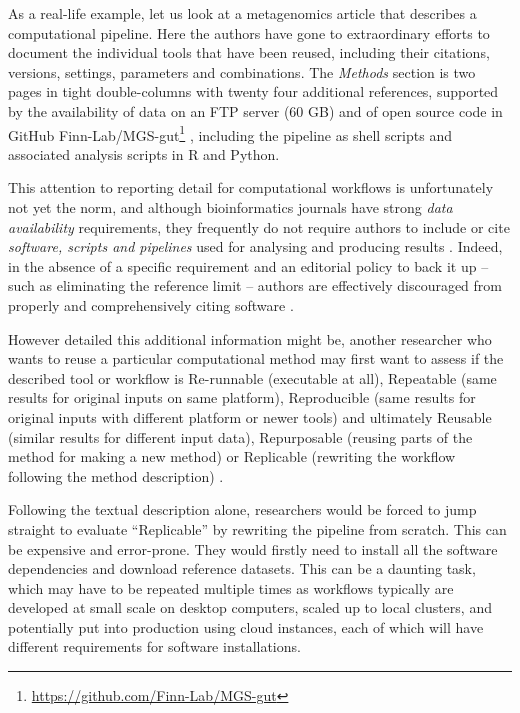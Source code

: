 As a real-life example, let us look at a metagenomics article
\cite{Almeida 2019} that describes
a computational pipeline. Here the authors have gone to extraordinary
efforts to document the individual tools that have been reused,
including their citations, versions, settings, parameters and
combinations. The \emph{Methods} section is two pages in tight
double-columns with twenty four additional references, supported by the
availability of data on an FTP server (60 GB)
\cite{EMBL-EBI 2019}
and of open source code in GitHub
Finn-Lab/MGS-gut\footnote{\url{https://github.com/Finn-Lab/MGS-gut}}
\cite{finn-lab-mgsgut}, including the
pipeline as shell scripts and associated analysis scripts in R and
Python.

This attention to reporting detail for computational workflows is
unfortunately not yet the norm, and although bioinformatics journals
have strong \emph{data availability} requirements, they frequently do
not require authors to include or cite \emph{software, scripts and
pipelines} used for analysing and producing results \cite{ch5-108}.
Indeed, in the absence of a specific requirement and an editorial policy
to back it up -- such as eliminating the reference limit -- authors are
effectively discouraged from properly and comprehensively citing
software \cite{ch5-53}.

However detailed this additional information might be, another
researcher who wants to reuse a particular computational method may
first want to assess if the described tool or workflow is Re-runnable
(executable at all), Repeatable (same results for original inputs on
same platform), Reproducible (same results for original inputs with
different platform or newer tools) and ultimately Reusable (similar
results for different input data), Repurposable (reusing parts of the
method for making a new method) or Replicable (rewriting the workflow
following the method description)
\cite{Benureau 2017,ch5-54}.

Following the textual description alone, researchers would be forced to
jump straight to evaluate ``Replicable'' by rewriting the pipeline from
scratch. This can be expensive and error-prone. They would firstly need
to install all the software dependencies and download reference
datasets. This can be a daunting task, which may have to be repeated
multiple times as workflows typically are developed at small scale on
desktop computers, scaled up to local clusters, and potentially put into
production using cloud instances, each of which will have different
requirements for software installations.

